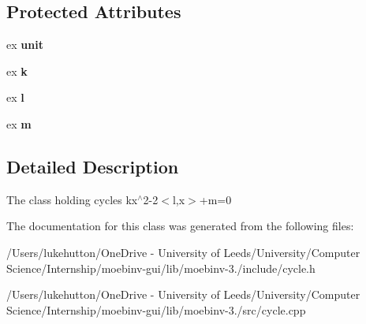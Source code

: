 \subsection*{Protected Attributes}
\begin{DoxyCompactItemize}
\item 
\mbox{\label{class_moeb_inv_1_1cycle_a24cfb770bb714d257c73f277b6907d87}} 
ex {\bfseries unit}
\item 
\mbox{\label{class_moeb_inv_1_1cycle_a011e43461950d16ae980cfb73b446827}} 
ex {\bfseries k}
\item 
\mbox{\label{class_moeb_inv_1_1cycle_afb8241122390156518d2dee04e3df2e6}} 
ex {\bfseries l}
\item 
\mbox{\label{class_moeb_inv_1_1cycle_a2b064bd63cc048aef8433252b1c35d6a}} 
ex {\bfseries m}
\end{DoxyCompactItemize}


\subsection{Detailed Description}
The class holding cycles kx$^\wedge$2-\/2$<$l,x$>$+m=0 

The documentation for this class was generated from the following files\+:\begin{DoxyCompactItemize}
\item 
/\+Users/lukehutton/\+One\+Drive -\/ University of Leeds/\+University/\+Computer Science/\+Internship/moebinv-\/gui/lib/moebinv-\/3./include/cycle.\+h\item 
/\+Users/lukehutton/\+One\+Drive -\/ University of Leeds/\+University/\+Computer Science/\+Internship/moebinv-\/gui/lib/moebinv-\/3./src/cycle.\+cpp\end{DoxyCompactItemize}
